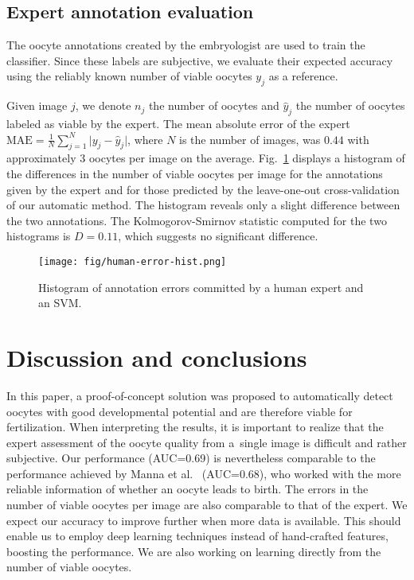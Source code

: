 \documentclass[]{spie}  %
\begin{document}
\subsection{Expert annotation evaluation}
\label{sec:expert-accuracy}

The oocyte annotations created by the embryologist are used to train the classifier. Since these labels are subjective, we evaluate their expected accuracy using the reliably known number of viable oocytes $y_j$ as a reference.

Given image $j$, we denote $n_j$ the number of oocytes and $\hat{y}_j$ the number of oocytes labeled as viable by the expert. The mean absolute error of the expert $\text{MAE} = {\frac{1}{N} \sum_{j=1}^N \lvert y_j - \hat{y}_j \rvert}$, where $N$ is the number of images, was $0.44$ with approximately 3 oocytes per image on the average. Fig.~\ref{fig:human-error-hist} displays a histogram of the differences in the number of viable oocytes per image for the annotations given by the expert and for those predicted by the leave-one-out cross-validation of our automatic method. The histogram reveals only a slight difference between the two annotations. The Kolmogorov-Smirnov statistic computed for the two histograms is $D=0.11$, which suggests no significant difference.

\begin{figure}[t]
\centering
\texttt{[image: fig/human-error-hist.png]}
\caption{Histogram of annotation errors committed by a human expert and an SVM.}
\label{fig:human-error-hist}
\end{figure}

\section{Discussion and conclusions}

In this paper, a proof-of-concept solution was proposed to automatically detect oocytes with good developmental potential and are therefore viable for fertilization.  When interpreting the results, it is important to realize that the expert assessment of the oocyte quality from a~single image is difficult and rather subjective. Our performance (AUC=0.69) is nevertheless comparable to the performance achieved by Manna et al.~\cite{manna2013} (AUC=0.68), who worked with the more reliable information of whether an oocyte leads to birth. The errors in the number of viable oocytes per image are also comparable to that of the expert. We expect our accuracy to improve further when more data is available. This should enable us to employ deep learning techniques instead of hand-crafted features, boosting the performance. We are also working on learning directly from the number of viable oocytes. 
\end{document}
